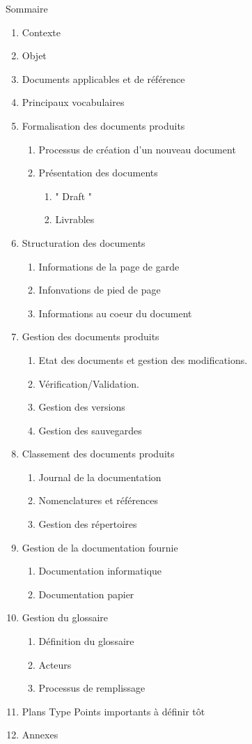 Sommaire
\begin{enumerate}
\item Contexte
\item Objet
\item Documents applicables et de référence
\item Principaux vocabulaires
\item Formalisation des documents produits
	\begin{enumerate}
	\item Processus de création d'un nouveau document
	\item Présentation des documents
		\begin{enumerate}
		\item " Draft "
		\item Livrables
		\end{enumerate}
	\end{enumerate}
\item Structuration des documents
	\begin{enumerate}
	\item Informations de la page de garde
	\item Infonvations de pied de page
	\item Informations au coeur du document
	\end{enumerate}
\item Gestion des documents produits
	\begin{enumerate}
	\item Etat des documents et gestion des modifications.
	\item Vérification/Validation.
	\item Gestion des versions
	\item Gestion des sauvegardes
	\end{enumerate}
\item Classement des documents produits
	\begin{enumerate}
	\item Journal de la documentation
	\item Nomenclatures et références 
	\item Gestion des répertoires
	\end{enumerate}
\item Gestion de la documentation fournie
	\begin{enumerate}
	\item Documentation informatique
	\item Documentation papier
	\end{enumerate}
\item Gestion du glossaire
	\begin{enumerate}
	\item Définition du glossaire
	\item Acteurs
	\item Processus de remplissage
	\end{enumerate}
\item Plans Type \rightarrow Points importants à définir tôt
\item Annexes
\end{enumerate}

